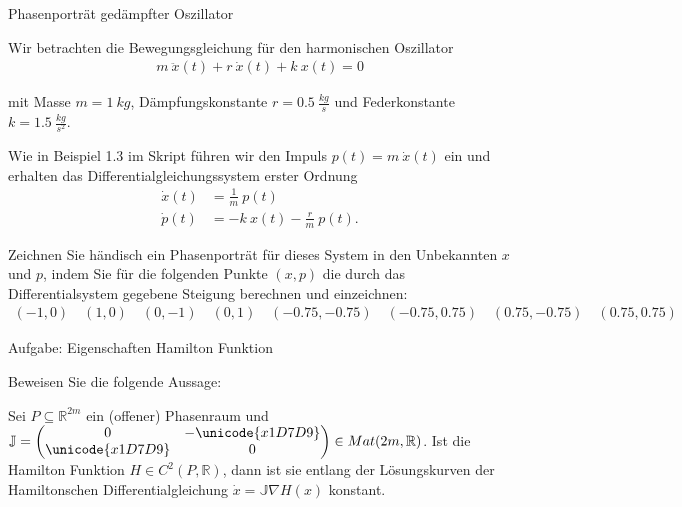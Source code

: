 \begin{emphBox}{}{}{Phasenporträt gedämpfter Oszillator}

\par
Wir betrachten die Bewegungsgleichung für den harmonischen Oszillator
\begin{align*}
m ~ \ddot x(t) + r ~ \dot x(t) + k ~ x(t) = 0
\end{align*}
\par
mit Masse \(m = 1  ~ kg\), Dämpfungskonstante \(r = 0.5 ~ \frac{kg}{s}\) und Federkonstante \(k = 1.5 ~ \frac{kg}{s^2}\).

\par
Wie in Beispiel 1.3 im Skript führen wir den Impuls \(p(t) = m ~ \dot x(t)\) ein und erhalten das Differentialgleichungssystem erster Ordnung
\begin{align*}
\dot x(t) &= \frac{1}{m} ~ p(t)\\
\dot p(t) &= -k ~ x(t) - \frac{r}{m} ~ p(t).
\end{align*}
\par
Zeichnen Sie händisch ein Phasenporträt für dieses System in den Unbekannten \(x\) und \(p\), indem Sie für die folgenden Punkte \((x,p)\) die durch das Differentialsystem gegebene Steigung berechnen und einzeichnen:
\begin{align*}
(-1, 0) \quad  (1, 0) \quad (0, -1) \quad  (0, 1) \quad (-0.75, -0.75) \quad  (-0.75, 0.75) \quad (0.75, -0.75) \quad (0.75, 0.75)
\end{align*}\end{emphBox}

\begin{emphBox}{}{}{Aufgabe: Eigenschaften Hamilton Funktion}

\par
Beweisen Sie die folgende Aussage:

\par
Sei \(P \subseteq \mathbb{R}^{2m}\) ein (offener) Phasenraum und \(\mathbb{J} = \begin{pmatrix} 0 & - \unicode{x1D7D9} \\ \unicode{x1D7D9} & 0 \end{pmatrix} \in Mat(2m, \mathbb{R})\). Ist die Hamilton Funktion \(H \in C^2(P, \mathbb{R})\), dann ist sie entlang der Lösungskurven der Hamiltonschen Differentialgleichung \(\dot x = \mathbb{J} \nabla H(x)\) konstant.
\end{emphBox}


